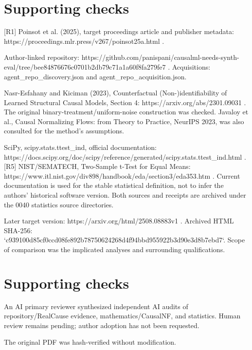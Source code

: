\documentclass[10pt]{article}
\begin{document}
\section*{Supporting checks}
[R1] Poinsot et al. (2025), target proceedings article and publisher metadata: https://proceedings.mlr.press/v267/poinsot25a.html .\par
[R2] Author-linked repository: https://github.com/panispani/causalml-needs-synth-eval/tree/bee84876676c0701b2db79c71a1a60f8fa279fe7 . Acquisitions: agent\_repo\_discovery.json and agent\_repo\_acquisition.json.\par
[R3] Nasr-Esfahany and Kiciman (2023), Counterfactual (Non-)identifiability of Learned Structural Causal Models, Section 4: https://arxiv.org/abs/2301.09031 . The original binary-treatment/uniform-noise construction was checked. Javaloy et al., Causal Normalizing Flows: from Theory to Practice, NeurIPS 2023, was also consulted for the method’s assumptions.\par
[R4] SciPy, scipy.stats.ttest\_ind, official documentation: https://docs.scipy.org/doc/scipy/reference/generated/scipy.stats.ttest\_ind.html . [R5] NIST/SEMATECH, Two-Sample t-Test for Equal Means: https://www.itl.nist.gov/div898/handbook/eda/section3/eda353.htm . Current documentation is used for the stable statistical definition, not to infer the authors’ historical software version. Both sources and receipts are archived under the 0040 statistics source directories.\par
[R6] Later target version: https://arxiv.org/html/2508.08883v1 . Archived HTML SHA-256: `c939100d85cf0ccd08fe892b78750624268d4f94bbd955922b3d90e3d8b7ebd7`. Scope of comparison was the implicated analyses and surrounding qualifications.\par
\section*{Supporting checks}
An AI primary reviewer synthesized independent AI audits of repository/RealCause evidence, mathematics/CausalNF, and statistics. Human review remains pending; author adoption has not been requested.\par
The original PDF was hash-verified without modification.\par
\end{document}
